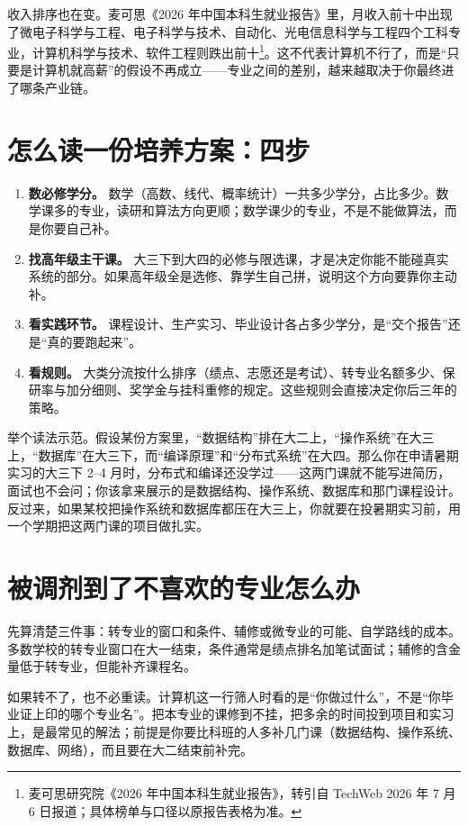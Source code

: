 \documentclass[UTF8,zihao=5,openany]{ctexbook}
\begin{document}
收入排序也在变。麦可思《2026 年中国本科生就业报告》里，月收入前十中出现了微电子科学与工程、电子科学与技术、自动化、光电信息科学与工程四个工科专业，计算机科学与技术、软件工程则跌出前十\footnote{麦可思研究院《2026 年中国本科生就业报告》，转引自 TechWeb 2026 年 7 月 6 日报道；具体榜单与口径以原报告表格为准。}。这不代表计算机不行了，而是“只要是计算机就高薪”的假设不再成立——专业之间的差别，越来越取决于你最终进了哪条产业链。

\section{怎么读一份培养方案：四步}
\begin{enumerate}
\item \textbf{数必修学分。} 数学（高数、线代、概率统计）一共多少学分，占比多少。数学课多的专业，读研和算法方向更顺；数学课少的专业，不是不能做算法，而是你要自己补。
\item \textbf{找高年级主干课。} 大三下到大四的必修与限选课，才是决定你能不能碰真实系统的部分。如果高年级全是选修、靠学生自己拼，说明这个方向要靠你主动补。
\item \textbf{看实践环节。} 课程设计、生产实习、毕业设计各占多少学分，是“交个报告”还是“真的要跑起来”。
\item \textbf{看规则。} 大类分流按什么排序（绩点、志愿还是考试）、转专业名额多少、保研率与加分细则、奖学金与挂科重修的规定。这些规则会直接决定你后三年的策略。
\end{enumerate}

举个读法示范。假设某份方案里，“数据结构”排在大二上，“操作系统”在大三上，“数据库”在大三下，而“编译原理”和“分布式系统”在大四。那么你在申请暑期实习的大三下 2--4 月时，分布式和编译还没学过——这两门课就不能写进简历，面试也不会问；你该拿来展示的是数据结构、操作系统、数据库和那门课程设计。反过来，如果某校把操作系统和数据库都压在大三上，你就要在投暑期实习前，用一个学期把这两门课的项目做扎实。

\section{被调剂到了不喜欢的专业怎么办}
先算清楚三件事：转专业的窗口和条件、辅修或微专业的可能、自学路线的成本。多数学校的转专业窗口在大一结束，条件通常是绩点排名加笔试面试；辅修的含金量低于转专业，但能补齐课程名。

如果转不了，也不必重读。计算机这一行筛人时看的是“你做过什么”，不是“你毕业证上印的哪个专业名”。把本专业的课修到不挂，把多余的时间投到项目和实习上，是最常见的解法；前提是你要比科班的人多补几门课（数据结构、操作系统、数据库、网络），而且要在大二结束前补完。
\end{document}
